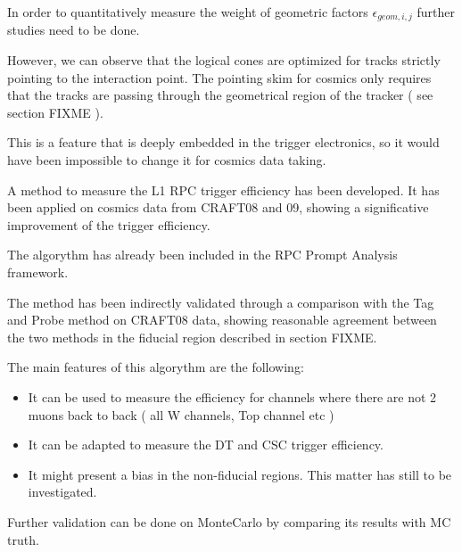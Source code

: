 In order to quantitatively measure the weight of geometric factors
$\epsilon_{geom,i,j}$ further studies need to be done. 



However, we can observe that the logical cones
are optimized for tracks strictly pointing to
the interaction point. The pointing skim 
for  cosmics only requires that the tracks
are passing through the geometrical region of the tracker ( see section FIXME ).

This is a feature that is deeply embedded in the trigger electronics,
so it would have been impossible to change it for cosmics data taking.




A method to measure the L1 RPC trigger efficiency has been developed.
It has been applied on cosmics data from CRAFT08 and 09, showing a significative 
improvement of the trigger efficiency.

The algorythm has already been included in the RPC Prompt Analysis framework.




The method has been indirectly validated
 through a comparison with the Tag and Probe 
method on CRAFT08 data, showing reasonable 
agreement between the two methods in the fiducial 
region described in section FIXME.


The main features of this algorythm are the following:

\begin{itemize} 
\item It can be used to measure the efficiency for channels
 where there are not 2 muons back to back ( all W channels, Top channel etc )
\item It can be adapted to measure the DT and CSC trigger efficiency.
\item It might present a bias in the non-fiducial regions. This matter has still 
to be investigated.
\end{itemize} 


Further validation can be done on MonteCarlo by comparing its 
results with MC truth.



%

